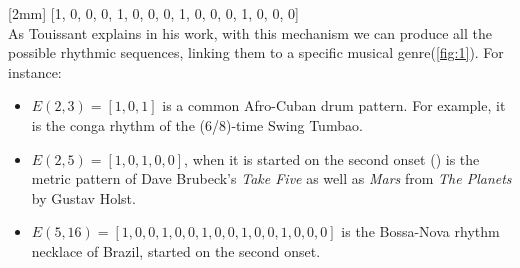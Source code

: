 \documentclass[main.tex]{subfiles}
\begin{document}
[2mm]
[1, 0, 0, 0, 1, 0, 0, 0, 1, 0, 0, 0, 1, 0, 0, 0]\\
[3mm]
As Touissant explains in his work\cite{Toussaint:2004:euclidean:rhythm}, with this mechanism we can produce all the possible rhythmic sequences, linking them to a specific musical genre(\autoref{fig:1}). For instance:
\begin{itemize}[noitemsep]
\item \begin{math}E(2,3)=[1,0,1]\end{math} is a common Afro-Cuban drum pattern. For example, it is the conga rhythm of the (6/8)-time Swing Tumbao\cite{Klower:1997}.
\item \begin{math}E(2,5)=[1,0,1,0,0]\end{math}, when it is started on the second onset (\begin{math}[1,0,0,1,0]\end{math}) is the metric pattern of Dave Brubeck’s \textit{Take Five} as well as \textit{Mars} from \textit{The Planets} by Gustav Holst\cite{Keith:1991}.
\item \begin{math}E(5,16)=[1,0,0,1,0,0,1,0,0,1,0,0,1,0,0,0]\end{math} is the Bossa-Nova rhythm necklace of Brazil, started on the second onset\cite{Behague:1973}.
\end{itemize}
\end{document}
